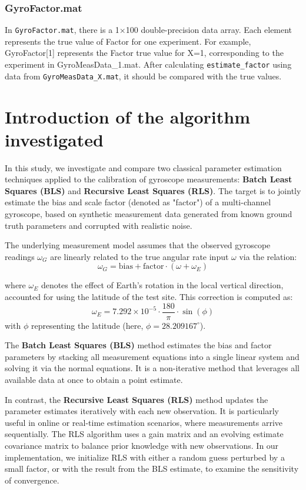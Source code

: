\documentclass[openany,12pt,UTF8]{article}
\begin{document}
\subsubsection{GyroFactor.mat}
In \texttt{GyroFactor.mat}, there is a 1×100 double-precision data array. Each element represents the true value of Factor for one experiment. For example, GyroFactor[1] represents the Factor true value for X=1, corresponding to the experiment in GyroMeasData\_1.mat. After calculating \texttt{estimate\_factor} using data from \texttt{GyroMeasData\_X.mat}, it should be compared with the true values.

\section{Introduction of the algorithm investigated}
In this study, we investigate and compare two classical parameter estimation techniques applied to the calibration of gyroscope measurements: \textbf{Batch Least Squares (BLS)} and \textbf{Recursive Least Squares (RLS)}. The target is to jointly estimate the bias and scale factor (denoted as "factor") of a multi-channel gyroscope, based on synthetic measurement data generated from known ground truth parameters and corrupted with realistic noise.

The underlying measurement model assumes that the observed gyroscope readings $\omega_G$ are linearly related to the true angular rate input $\omega$ via the relation:
$$
\omega_G = \text{bias} + \text{factor} \cdot (\omega + \omega_E)
$$

where $\omega_E$ denotes the effect of Earth's rotation in the local vertical direction, accounted for using the latitude of the test site. This correction is computed as:
$$
\omega_E = 7.292 \times 10^{-5} \cdot \frac{180}{\pi} \cdot \sin(\phi)
$$
with $\phi$ representing the latitude (here, $\phi = 28.209167^\circ$).

The \textbf{Batch Least Squares (BLS)} method estimates the bias and factor parameters by stacking all measurement equations into a single linear system and solving it via the normal equations. It is a non-iterative method that leverages all available data at once to obtain a point estimate.

In contrast, the \textbf{Recursive Least Squares (RLS)} method updates the parameter estimates iteratively with each new observation. It is particularly useful in online or real-time estimation scenarios, where measurements arrive sequentially. The RLS algorithm uses a gain matrix and an evolving estimate covariance matrix to balance prior knowledge with new observations. In our implementation, we initialize RLS with either a random guess perturbed by a small factor, or with the result from the BLS estimate, to examine the sensitivity of convergence.
\end{document}
